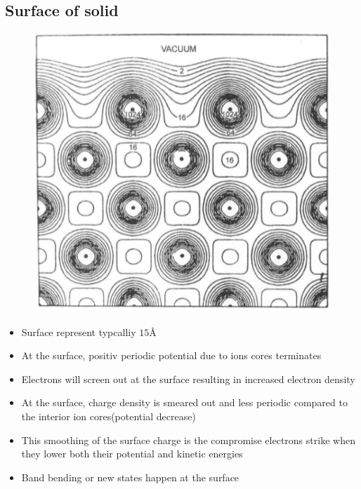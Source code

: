 \subsection{Surface of solid}
\begin{figure}[h]
    \centering
    \includegraphics[width=0.7\columnwidth]{images/surface.png}
    \label{fig:surface}
\end{figure}
\begin{itemize}
    \item Surface represent typcalliy \(15\)\r{A}
    \item At the surface, positiv periodic potential due to ions cores terminates
    \item Electrons will screen out at the surface resulting in  increased electron density
    \item At the surface, charge density is smeared out and less periodic compared to the interior ion cores(potential decrease)
    \item This smoothing of the surface charge is the compromise electrons strike when they lower both their potential and kinetic energies
    \item Band bending or new states happen at the surface
\end{itemize}
